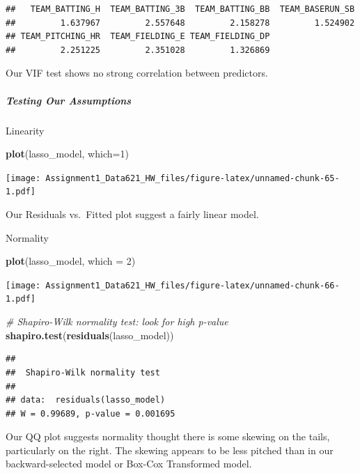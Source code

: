\documentclass[
]{article}
\newenvironment{Shaded}{\begin{snugshade}}{\end{snugshade}}
\newcommand{\AttributeTok}[1]{\textcolor[rgb]{0.13,0.29,0.53}{#1}}
\newcommand{\CommentTok}[1]{\textcolor[rgb]{0.56,0.35,0.01}{\textit{#1}}}
\newcommand{\DecValTok}[1]{\textcolor[rgb]{0.00,0.00,0.81}{#1}}
\newcommand{\FunctionTok}[1]{\textcolor[rgb]{0.13,0.29,0.53}{\textbf{#1}}}
\newcommand{\NormalTok}[1]{#1}
\begin{document}
\begin{verbatim}
##   TEAM_BATTING_H  TEAM_BATTING_3B  TEAM_BATTING_BB  TEAM_BASERUN_SB 
##         1.637967         2.557648         2.158278         1.524902 
## TEAM_PITCHING_HR  TEAM_FIELDING_E TEAM_FIELDING_DP 
##         2.251225         2.351028         1.326869
\end{verbatim}

Our VIF test shows no strong correlation between predictors.

\subparagraph{Testing Our Assumptions}\label{testing-our-assumptions}

Linearity

\begin{Shaded}
\begin{Highlighting}[]
\FunctionTok{plot}\NormalTok{(lasso\_model, }\AttributeTok{which=}\DecValTok{1}\NormalTok{)}
\end{Highlighting}
\end{Shaded}

\texttt{[image: Assignment1\_Data621\_HW\_files/figure-latex/unnamed-chunk-65-1.pdf]}

Our Residuals vs.~Fitted plot suggest a fairly linear model.

Normality

\begin{Shaded}
\begin{Highlighting}[]
\FunctionTok{plot}\NormalTok{(lasso\_model, }\AttributeTok{which =} \DecValTok{2}\NormalTok{)}
\end{Highlighting}
\end{Shaded}

\texttt{[image: Assignment1\_Data621\_HW\_files/figure-latex/unnamed-chunk-66-1.pdf]}

\begin{Shaded}
\begin{Highlighting}[]
\CommentTok{\# Shapiro{-}Wilk normality test: look for high p{-}value}
\FunctionTok{shapiro.test}\NormalTok{(}\FunctionTok{residuals}\NormalTok{(lasso\_model))}
\end{Highlighting}
\end{Shaded}

\begin{verbatim}
## 
##  Shapiro-Wilk normality test
## 
## data:  residuals(lasso_model)
## W = 0.99689, p-value = 0.001695
\end{verbatim}

Our QQ plot suggests normality thought there is some skewing on the
tails, particularly on the right. The skewing appears to be less pitched
than in our backward-selected model or Box-Cox Transformed model.
\end{document}
